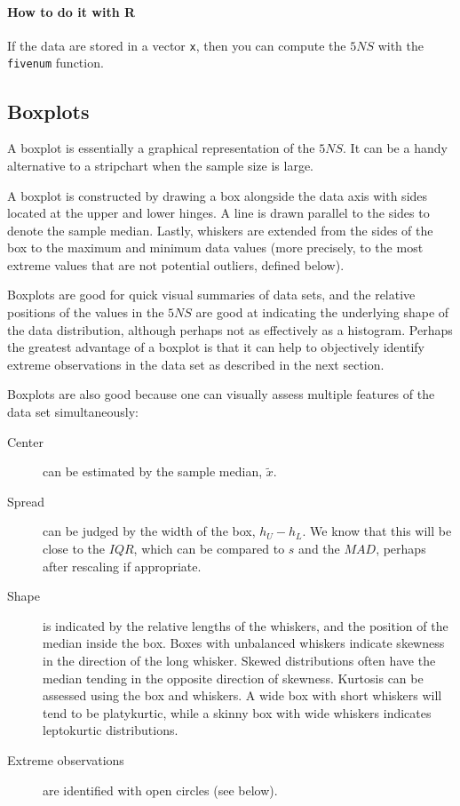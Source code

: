 \documentclass[captions=tableheading]{scrbook}
\begin{document}
\paragraph*{How to do it with \textsf{R}}

If the data are stored in a vector \texttt{x}, then you can compute the \(5NS\) with the \texttt{fivenum} function.
\subsection{Boxplots}
\label{sec-3-4-3}

\label{sub:boxplots}

A boxplot is essentially a graphical representation of the \(5NS\). It can be a handy alternative to a stripchart when the sample size is large.

A boxplot is constructed by drawing a box alongside the data axis with sides located at the upper and lower hinges. A line is drawn parallel to the sides to denote the sample median. Lastly, whiskers are extended from the sides of the box to the maximum and minimum data values (more precisely, to the most extreme values that are not potential outliers, defined below).

Boxplots are good for quick visual summaries of data sets, and the relative positions of the values in the \(5NS\) are good at indicating the underlying shape of the data distribution, although perhaps not as effectively as a histogram. Perhaps the greatest advantage of a boxplot is that it can help to objectively identify extreme observations in the data set as described in the next section.

Boxplots are also good because one can visually assess multiple features of the data set simultaneously:

\begin{description}
\item[Center] can be estimated by the sample median, \(\tilde{x}\).
\item[Spread] can be judged by the width of the box, \(h_{U}-h_{L}\). We know that this will be close to the \(IQR\), which can be compared to \(s\) and the \(MAD\), perhaps after rescaling if appropriate.
\item[Shape] is indicated by the relative lengths of the whiskers, and the position of the median inside the box. Boxes with unbalanced whiskers indicate skewness in the direction of the long whisker. Skewed distributions often have the median tending in the opposite direction of skewness. Kurtosis can be assessed using the box and whiskers. A wide box with short whiskers will tend to be platykurtic, while a skinny box with wide whiskers indicates leptokurtic distributions.
\item[Extreme observations] are identified with open circles (see below).
\end{description}
\end{document}
